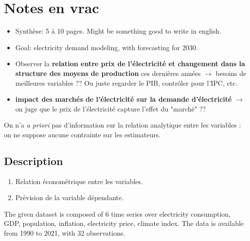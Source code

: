 \section{Notes en vrac}
\begin{itemize}
    \item Synthèse: 5 à 10 pages. Might be something good to write in english.
    \item Goal: electricity demand modeling, with forecasting for 2030. 
    \item Observer la \textbf{relation entre prix de l'électricité et changement dans la structure des moyens de production} ces dernières années $\to$ besoins de meilleures variables ?? Ou juste regarder le PIB, contrôler pour l'IPC, etc.
    \item \textbf{impact des marchés de l'électricité sur la demande d'électricité} $\to$ on juge que le prix de l'électricité capture l'effet du "marché" ??
\end{itemize}

On n'a \textit{a priori} pas d'information sur la relation analytique entre les variables : on ne suppose aucune contrainte sur les estimateurs.



\subsection{Description}
\begin{enumerate}
    \item Relation économétrique entre les variables. 
    \item Prévision de la variable dépendante.
\end{enumerate}
The given dataset is composed of 6 time series over electricity consumption, GDP, population, inflation, electricity price, climate index. The data is available from 1990 to 2021, with 32 observations. 

